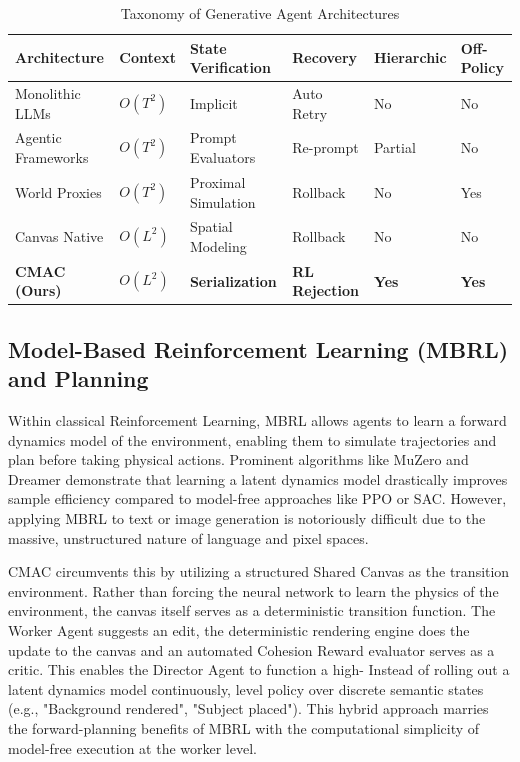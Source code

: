 \documentclass[pdflatex,sn-mathphys-num]{sn-jnl}
\begin{document}
\begin{table}[h]
\caption{Taxonomy of Generative Agent Architectures}
\label{tab:taxonomy}
\centering
\footnotesize
\begin{tabular}{@{}llllll@{}}
\toprule
\textbf{Architecture} & \textbf{Context} & \textbf{State Verification} & \textbf{Recovery} & \textbf{Hierarchic} & \textbf{Off-Policy} \\
\midrule
Monolithic LLMs & $O(T^2)$ & Implicit & Auto Retry & No & No \\
Agentic Frameworks & $O(T^2)$ & Prompt Evaluators & Re-prompt & Partial & No \\
World Proxies & $O(T^2)$ & Proximal Simulation & Rollback & No & Yes \\
Canvas Native & $O(L^2)$ & Spatial Modeling & Rollback & No & No \\
\textbf{CMAC (Ours)} & \textbf{$O(L^2)$} & \textbf{Serialization} & \textbf{RL Rejection} & \textbf{Yes} & \textbf{Yes} \\
\bottomrule
\end{tabular}
\end{table}

\subsection{Model-Based Reinforcement Learning (MBRL) and Planning}
Within classical Reinforcement Learning, MBRL allows agents to learn a forward dynamics model of the environment, enabling them to simulate trajectories and plan before taking physical actions. Prominent algorithms like MuZero and Dreamer demonstrate that learning a latent dynamics model drastically improves sample efficiency compared to model-free approaches like PPO or SAC. However, applying MBRL to text or image generation is notoriously difficult due to the massive, unstructured nature of language and pixel spaces. 

CMAC circumvents this by utilizing a structured Shared Canvas as the transition environment. Rather than forcing the neural network to learn the physics of the environment, the canvas itself serves as a deterministic transition function. The Worker Agent suggests an edit, the deterministic rendering engine does the update to the canvas and an automated Cohesion Reward evaluator serves as a critic. This enables the Director Agent to function a high- Instead of rolling out a latent dynamics model continuously, level policy over discrete semantic states (e.g., "Background rendered", "Subject placed"). This hybrid approach marries the forward-planning benefits of MBRL with the computational simplicity of model-free execution at the worker level.
\end{document}

